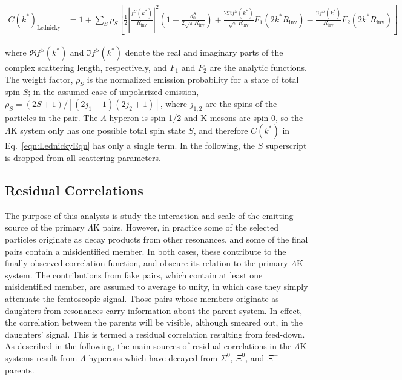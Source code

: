 \documentclass[ALICE,manyauthors]{cernphprep}
\newcommand{\Lam}{$\Lambda$\xspace}
\newcommand{\LamK}{$\Lambda$K\xspace}
\begin{document}
\begin{equation}
\begin{aligned}
C(k^{*})_{\mathrm{Lednick\acute{y}}} &= 1 + \sum_{S}\rho_{S}\left[\frac{1}{2}\left|\frac{f^{S}(k^{*})}{R_{\mathrm{inv}}}\right|^2\left(1-\frac{d^{S}_{0}}{2\sqrt{\pi}R_{\mathrm{inv}}}\right)+\frac{2\Re f^{S}(k^{*})}{\sqrt{\pi}R_{\mathrm{inv}}}F_{1}(2k^{*}R_{\mathrm{inv}})-\frac{\Im f^{S}(k^{*})}{R_{\mathrm{inv}}}F_{2}(2k^{*}R_{\mathrm{inv}})\right]
\end{aligned}  
\label{eqn:LednickyEqn}
\end{equation}

where $\Re f^{S}(k^{*})$ and $\Im f^{S}(k^{*})$ denote the real and imaginary parts of the complex scattering length, respectively, and $F_{1}$ and $F_{2}$ are the analytic functions.
The weight factor, $\rho_{S}$ is the normalized emission probability for a state of total spin $S$; in the assumed case of unpolarized emission, $\rho_{S} = (2S+1)/[(2j_{1}+1)(2j_{2}+1)]$, where $j_{1,2}$ are the spins of the particles in the pair.
The \Lam hyperon is spin-1/2 and K mesons are spin-0, so the \LamK system only has one possible total spin state $S$, and therefore $C(k^{*})$ in Eq.\ \ref{eqn:LednickyEqn} has only a single term.
In the following, the $S$ superscript is dropped from all scattering parameters.

\subsection{Residual Correlations}
\label{ResidualCorrelations}

The purpose of this analysis is study the interaction and scale of the emitting source of the primary \LamK pairs.
However, in practice some of the selected particles originate as decay products from other resonances, and some of the final pairs contain a misidentified member.
In both cases, these contribute to the finally observed correlation function, and obscure its relation to the primary \LamK system.
The contributions from fake pairs, which contain at least one misidentified member, are assumed to average to unity, in which case they simply attenuate the femtoscopic signal.
Those pairs whose members originate as daughters from resonances carry information about the parent system.
In effect, the correlation between the parents will be visible, although smeared out, in the daughters' signal.
This is termed a residual correlation resulting from feed-down.  
As described in the following, the main sources of residual correlations in the \LamK systems result from \Lam hyperons which have decayed from $\Sigma^{0}$, $\Xi^{0}$, and $\Xi^{-}$ parents.
\end{document}
